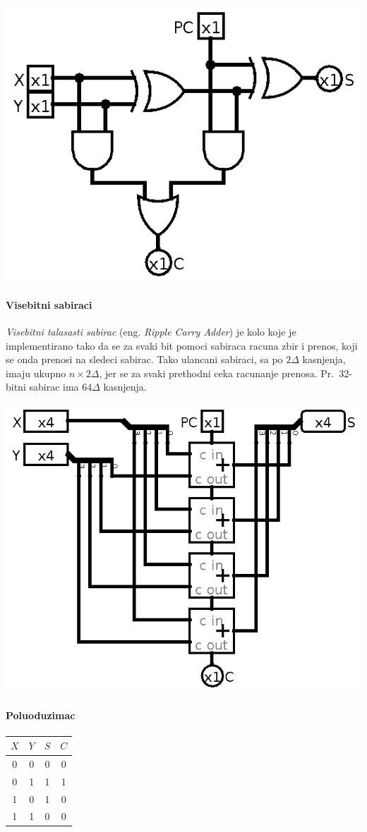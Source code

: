 \documentclass[12p,a4paper]{article}
\begin{document}
\begin{multicols}{2}
    \includegraphics[width=0.7\columnwidth]{Figures/full_adder.png}

    \paragraph{Visebitni sabiraci}
    
    \emph{Visebitni talasasti sabirac} (eng. \emph{Ripple Carry Adder}) je kolo
    koje je implementirano tako da se za svaki bit pomoci sabiraca racuna zbir 
    i prenos, koji se onda prenosi na sledeci sabirac. Tako ulancani sabiraci,
    sa po $2\Delta$ kasnjenja, imaju ukupno $n \times 2\Delta$, jer se za svaki
    prethodni ceka racunanje prenosa. Pr.\ 32-bitni sabirac ima $64\Delta$ 
    kasnjenja.

    \includegraphics[width=0.7\columnwidth]{Figures/riplle_carry_adder.png}

    \paragraph{Poluoduzimac}
    
    \begin{tabular}{*{4}{c}}
        $X$ & $Y$ & $S$ & $C$ \\
        \midrule
         0  &  0  &  0  &  0  \\
         0  &  1  &  1  &  1  \\
         1  &  0  &  1  &  0  \\
         1  &  1  &  0  &  0  \\
    \end{tabular}


\end{multicols}
\end{document}
